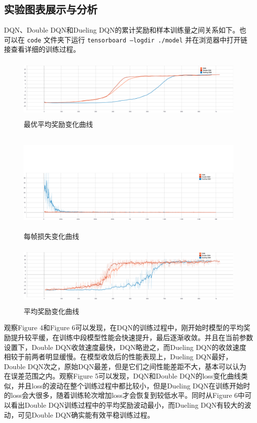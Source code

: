 \documentclass[a4paper,12pt]{article}
\begin{document}
\begin{CJK}{UTF8}{gbsn}
\subsection{实验图表展示与分析}
DQN、Double DQN和Dueling DQN的累计奖励和样本训练量之间关系如下。也可以在 \texttt{code} 文件夹下运行 
\texttt{tensorboard --logdir ./model} 并在浏览器中打开链接查看详细的训练过程。\\
\begin{figure}[h!]
	\centering
	\includegraphics[width=14cm,height=3cm]{./resource/Best 100-episodes average reward.png}
	\caption{最优平均奖励变化曲线}
\end{figure}
\newpage
\begin{figure}[h!]
	\centering
	\includegraphics[width=14cm,height=5cm]{./resource/Loss per frame.png}
	\caption{每帧损失变化曲线}
\end{figure}
\begin{figure}[h!]
	\centering
	\includegraphics[width=14cm,height=3cm]{./resource/Reward per episode.png}
	\caption{平均奖励变化曲线}
\end{figure}
\noindent 观察Figure 4和Figure 6可以发现，在DQN的训练过程中，刚开始时模型的平均奖励提升较平缓，在训练中段模型性能会快速提升，最后逐渐收敛。并且在当前参数设置下，Double DQN收敛速度最快，DQN略逊之，而Dueling DQN的收敛速度相较于前两者明显缓慢。在模型收敛后的性能表现上，Dueling DQN最好，Double DQN次之，原始DQN最差，但是它们之间性能差距不大，基本可以认为在误差范围之内。观察Figure 5可以发现，DQN和Double DQN的loss变化曲线类似，并且loss的波动在整个训练过程中都比较小，但是Dueling DQN在训练开始时的loss会大很多，随着训练轮次增加loss才会恢复到较低水平。同时从Figure 6中可以看出Double DQN训练过程中的平均奖励波动最小，而Dueling DQN有较大的波动，可见Double DQN确实能有效平稳训练过程。

\end{CJK}
\end{document}
